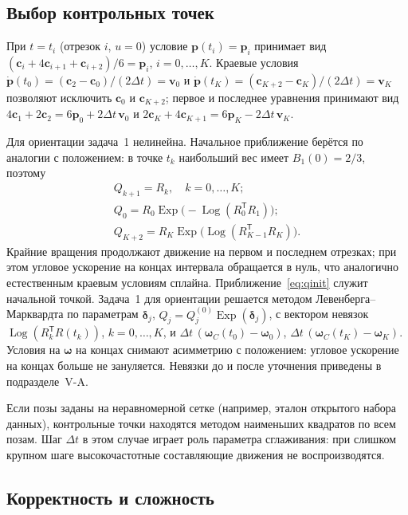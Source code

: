 \documentclass{misisarticle}
\newcommand{\Exp}{\operatorname{Exp}}
\newcommand{\Log}{\operatorname{Log}}
\newcommand{\T}{^{\mathsf{T}}}
\newcommand{\vb}[1]{\mathbf{#1}}
\begin{document}
\subsection{Выбор контрольных точек}

При $t=t_i$ (отрезок $i$, $u=0$) условие $\vb p(t_i)=\vb p_i$ принимает вид $(\vb c_i+4\vb c_{i+1}+\vb c_{i+2})/6=\vb p_i$, $i=0,\dots,K$. Краевые условия $\dot{\vb p}(t_0)=(\vb c_2-\vb c_0)/(2\Delta t)=\vb v_0$ и $\dot{\vb p}(t_K)=(\vb c_{K+2}-\vb c_K)/(2\Delta t)=\vb v_K$ позволяют исключить $\vb c_0$ и $\vb c_{K+2}$; первое и последнее уравнения принимают вид $4\vb c_1+2\vb c_2=6\vb p_0+2\Delta t\,\vb v_0$ и $2\vb c_K+4\vb c_{K+1}=6\vb p_K-2\Delta t\,\vb v_K$.

Для ориентации задача~1 нелинейна. Начальное приближение берётся по аналогии с положением: в точке $t_k$ наибольший вес имеет $B_1(0)=2/3$, поэтому
\begin{equation}
  \begin{gathered}
    Q_{k+1}=R_k,\quad k=0,\dots,K;\\
    Q_0=R_0\Exp\bigl(-\Log(R_0\T R_1)\bigr);\\
    Q_{K+2}=R_K\Exp\bigl(\Log(R_{K-1}\T R_K)\bigr).
  \end{gathered}
  \label{eq:qinit}
\end{equation}
Крайние вращения продолжают движение на первом и последнем отрезках; при этом угловое ускорение на концах интервала обращается в нуль, что аналогично естественным краевым условиям сплайна. Приближение~\eqref{eq:qinit} служит начальной точкой. Задача~1 для ориентации решается методом Левенберга--Марквардта по параметрам $\boldsymbol\delta_j$, $Q_j=Q_j^{(0)}\Exp(\boldsymbol\delta_j)$, с вектором невязок $\Log(R_k\T R(t_k))$, $k=0,\dots,K$, и $\Delta t\,(\boldsymbol\omega_C(t_0)-\boldsymbol\omega_0)$, $\Delta t\,(\boldsymbol\omega_C(t_K)-\boldsymbol\omega_K)$. Условия на $\boldsymbol\omega$ на концах снимают асимметрию с положением: угловое ускорение на концах больше не зануляется. Невязки до и после уточнения приведены в подразделе~V-A.

Если позы заданы на неравномерной сетке (например, эталон открытого набора данных), контрольные точки находятся методом наименьших квадратов по всем позам. Шаг $\Delta t$ в этом случае играет роль параметра сглаживания: при слишком крупном шаге высокочастотные составляющие движения не воспроизводятся.

\subsection{Корректность и сложность}
\end{document}
